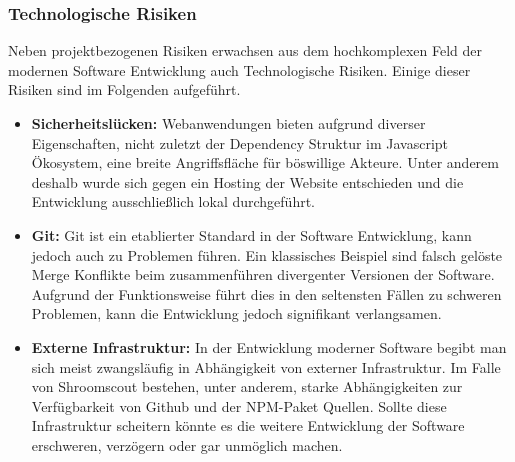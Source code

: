 \subsubsection{Technologische Risiken}

Neben projektbezogenen Risiken erwachsen aus dem hochkomplexen Feld der modernen Software Entwicklung auch Technologische Risiken. Einige dieser Risiken
sind im Folgenden aufgeführt.

\begin{itemize}

	\item \textbf{Sicherheitslücken:}
	      Webanwendungen bieten aufgrund diverser Eigenschaften, nicht zuletzt der Dependency Struktur im Javascript Ökosystem, eine breite Angriffsfläche
	      für böswillige Akteure. Unter anderem deshalb wurde sich gegen ein Hosting der Website entschieden und die Entwicklung ausschließlich lokal durchgeführt.

	\item \textbf{Git:}
	      Git ist ein etablierter Standard in der Software Entwicklung, kann jedoch auch zu Problemen führen. Ein klassisches Beispiel sind falsch gelöste Merge
	      Konflikte beim zusammenführen divergenter Versionen der Software. Aufgrund der Funktionsweise führt dies in den seltensten Fällen zu schweren Problemen,
	      kann die Entwicklung jedoch signifikant verlangsamen.

	\item \textbf{Externe Infrastruktur:}
	      In der Entwicklung moderner Software begibt man sich meist zwangsläufig in Abhängigkeit von externer Infrastruktur. Im Falle von Shroomscout bestehen,
	      unter anderem, starke Abhängigkeiten zur Verfügbarkeit von Github und der NPM-Paket Quellen. Sollte diese Infrastruktur scheitern könnte es die weitere
	      Entwicklung der Software erschweren, verzögern oder gar unmöglich machen.

\end{itemize}
